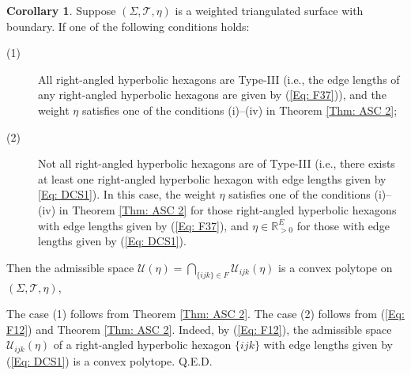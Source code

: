 \documentclass[12pt]{amsart}
\theoremstyle{definition}
\newtheorem{corollary}[theorem]{Corollary}
\def\qed{\hfill{Q.E.D.}\smallskip}
\begin{document}
\begin{corollary}\label{Cor: ASC 2}
Suppose $(\Sigma,\mathcal{T},\eta)$ is a weighted triangulated surface with boundary.
If one of the following conditions holds:
\begin{description}
\item[(1)]
All right-angled hyperbolic hexagons are Type-III (i.e., the edge lengths of any right-angled hyperbolic hexagons are given by (\ref{Eq: F37})),
and the weight $\eta$ satisfies one of the conditions (i)--(iv) in Theorem \ref{Thm: ASC 2};

\item[(2)]
Not all right-angled hyperbolic hexagons are of Type-III (i.e., there exists at least one right-angled hyperbolic hexagon with edge lengths given by \eqref{Eq: DCS1}). 
In this case, the weight $\eta$ satisfies one of the conditions (i)--(iv) in Theorem \ref{Thm: ASC 2} for those right-angled hyperbolic hexagons with edge lengths given by (\ref{Eq: F37}),
and $\eta\in \mathbb{R}_{>0}^E$ for those with edge lengths given by (\ref{Eq: DCS1}).
\end{description}
Then the admissible space 
$\mathcal{U}(\eta)=\bigcap_{\{ijk\}\in F}\mathcal{U}_{ijk}(\eta)$ is a convex polytope on $(\Sigma,\mathcal{T},\eta)$,
\end{corollary}
\proof
The case (1) follows from Theorem \ref{Thm: ASC 2}.
The case (2) follows from (\ref{Eq: F12}) and Theorem \ref{Thm: ASC 2}.
Indeed, by (\ref{Eq: F12}), the admissible space $\mathcal{U}_{ijk}(\eta)$ of a right-angled hyperbolic hexagon $\{ijk\}$ with edge lengths given by (\ref{Eq: DCS1}) is a convex polytope.
\qed
\end{document}
